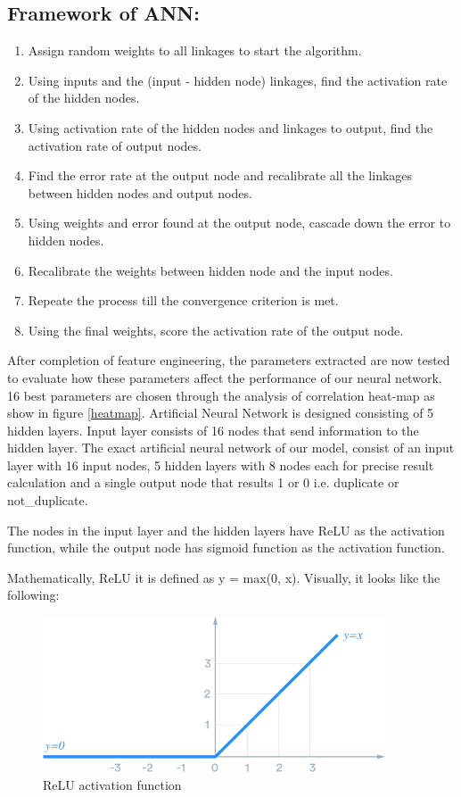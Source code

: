 \subsection{Framework of \acl{ANN}:}
\begin{enumerate}
	\item Assign random weights to all linkages to start the algorithm.
	\item Using inputs and the (input - hidden node) linkages, find the activation rate of the hidden nodes.
	\item Using activation rate of the hidden nodes and linkages to output, find the activation rate of output nodes.
	\item Find the error rate at the output node and recalibrate all the linkages between hidden nodes and output nodes.
	\item Using weights and error found at the output node, cascade down the error to hidden nodes.
	\item Recalibrate the weights between hidden node and the input nodes.
	\item Repeate the process till the convergence criterion is met.
	\item Using the final weights, score the activation rate of the output node.
\end{enumerate}

After completion of feature engineering, the parameters extracted are now tested to evaluate how these parameters affect the performance of our neural network. 16 best parameters are chosen through the analysis of correlation heat-map as show in figure \ref{heatmap}. Artificial Neural Network is designed consisting of 5 hidden layers. Input layer consists of 16 nodes that send information to the hidden layer. The exact artificial neural network of our model, consist of an input layer with 16 input nodes, 5 hidden layers with 8 nodes each for precise result calculation and a single output node that results 1 or 0 i.e. duplicate or not\_duplicate.

The nodes in the input layer and the hidden layers have \ac{ReLU} as the activation function, while the output node has sigmoid function as the activation function.

Mathematically, \ac{ReLU} it is defined as y = max(0, x). Visually, it looks like the following:

\begin{figure}[tbh]
	\begin{center}
		\includegraphics[width = 4in]{images/relu.png}
		\caption{ReLU activation function}
		\label{relu}
	\end{center}
\end{figure}

